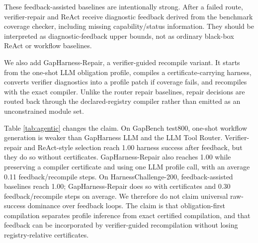 \documentclass[
  10pt,
]{article}
\begin{document}
These feedback-assisted baselines are intentionally strong. After a
failed route, verifier-repair and ReAct receive diagnostic feedback
derived from the benchmark coverage checker, including missing
capability/status information. They should be interpreted as
diagnostic-feedback upper bounds, not as ordinary black-box ReAct or
workflow baselines.

We also add GapHarness-Repair, a verifier-guided recompile variant. It
starts from the one-shot LLM obligation profile, compiles a
certificate-carrying harness, converts verifier diagnostics into a
profile patch if coverage fails, and recompiles with the exact compiler.
Unlike the router repair baselines, repair decisions are routed back
through the declared-registry compiler rather than emitted as an
unconstrained module set.

Table \ref{tab:agentic} changes the claim. On GapBench test800, one-shot
workflow generation is weaker than GapHarness LLM and the LLM Tool
Router. Verifier-repair and ReAct-style selection reach 1.00 harness
success after feedback, but they do so without certificates.
GapHarness-Repair also reaches 1.00 while preserving a compiler
certificate and using one LLM profile call, with an average 0.11
feedback/recompile steps. On HarnessChallenge-200, feedback-assisted
baselines reach 1.00; GapHarness-Repair does so with certificates and
0.30 feedback/recompile steps on average. We therefore do not claim
universal raw-success dominance over feedback loops. The claim is that
obligation-first compilation separates profile inference from exact
certified compilation, and that feedback can be incorporated by
verifier-guided recompilation without losing registry-relative
certificates.
\end{document}
